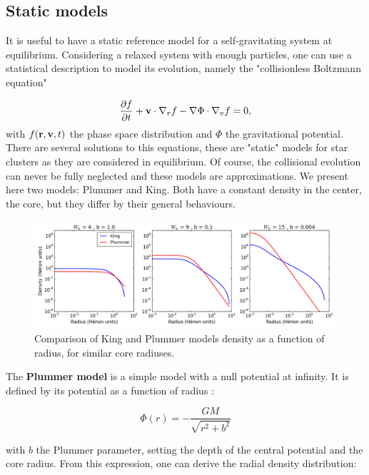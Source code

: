 \subsection{Static models}

It is useful to have a static reference model for a self-gravitating system at equilibrium. Considering a relaxed system with enough particles, one can use a statistical description to model its evolution, namely the "collisionless Boltzmann equation"

\begin{equation}
\frac{\partial f}{\partial t} + \bold{v} \cdot \nabla_r f - \nabla \Phi \cdot \nabla_v f = 0,
\end{equation}
with $f(\bold{r},\bold{v},t)$ the phase space distribution and $\Phi$ the gravitational potential. There are several solutions to this equations, these are "static" models for star clusters as they are considered in equilibrium. Of course, the collisional evolution can never be fully neglected and these models are approximations. We present here two models: Plummer and King. Both have a constant density in the center, the core, but they differ by their general behaviours. 


\begin{figure}
\center
\includegraphics[width=0.95\linewidth]{Figures/0_kingplummer.png}
\caption[Radial density for King and Plummer models]{Comparison of King and Plummer models density as a function of radius, for similar core radiuses.}
\label{Fig:0_plummerking}
\end{figure}


The \textbf{Plummer model} is a simple model with a null potential at infinity. It is defined by its potential as a function of radius \citep{BT}:

\begin{equation}
\Phi(r) = - \frac{G M}{\sqrt{r^2 + b^2}}
\end{equation}

with $b$ the Plummer parameter, setting the depth of the central potential and the core radius. From this expression, one can derive the radial density distribution:

